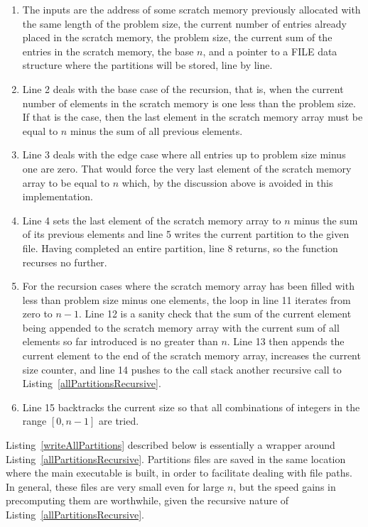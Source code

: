 \begin{enumerate}
\item The inputs are the address of some scratch memory previously allocated with the same length of the problem size, the current number of entries already placed in the scratch memory, the problem size, the current sum of the entries in the scratch memory, the base $n$, and a pointer to a FILE data structure where the partitions will be stored, line by line.
\item Line 2 deals with the base case of the recursion, that is, when the current number of elements in the scratch memory is one less than the problem size. If that is the case, then the last element in the scratch memory array must be equal to $n$ minus the sum of all previous elements.
\item Line 3 deals with the edge case where all entries up to problem size minus one are zero. That would force the very last element of the scratch memory array to be equal to $n$ which, by the discussion above is avoided in this implementation.
\item Line 4 sets the last element of the scratch memory array to $n$ minus the sum of its previous elements and line 5 writes the current partition to the given file. Having completed an entire partition, line 8 returns, so the function recurses no further.
\addtocounter{enumi}{6}
\item For the recursion cases where the scratch memory array has been filled with less than problem size minus one elements, the loop in line 11 iterates from zero to $n - 1$. Line 12 is a sanity check that the sum of the current element being appended to the scratch memory array with the current sum of all elements so far introduced is no greater than $n$. Line 13 then appends the current element to the end of the scratch memory array, increases the current size counter, and line 14 pushes to the call stack another recursive call to Listing~\ref{allPartitionsRecursive}.
\addtocounter{enumi}{1}
\item Line 15 backtracks the current size so that all combinations of integers in the range $[0, n - 1]$ are tried.
\end{enumerate}

Listing~\ref{writeAllPartitions} described below is essentially a wrapper around Listing~\ref{allPartitionsRecursive}. Partitions files are saved in the same location where the main executable is built, in order to facilitate dealing with file paths. In general, these files are very small even for large $n$, but the speed gains in precomputing them are worthwhile, given the recursive nature of Listing~\ref{allPartitionsRecursive}.

